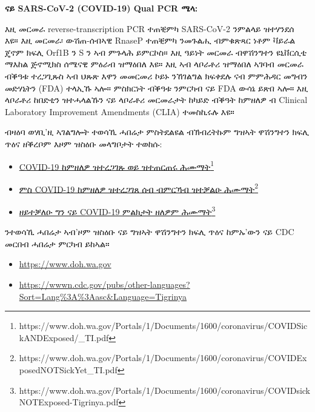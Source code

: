 \documentclass[10pt]{article}
\newcommand{\link}[2]{\href{#1}{#2}\footnote{#1}}
\begin{document}
\bigskip
\textbf{ናይ SARS-CoV-2 (COVID-19) Qual PCR ሜላ:}

እዚ መርመራ reverse-transcription PCR ተጠቒምካ SARS-CoV-2 ንምልላይ ዝተሃንደሰ እዩ። እዚ መርመራ፡
ውሽጠ-ሰብኣዊ RnaseP ተጠቒምካ ንመጉልሒ ብምቁጽጻር ነቶም ቫይራል ጄኖም ክፍሊ Orf1B ን S ን ኣብ ምጉላሕ
ይምርኮስ። እዚ ዓይነት መርመራ ብዋሽንግተን ዩኒቨርሲቲ ማእከል ጅኖሚክስ ሰሜናዊ ምዕራብ ዝማዕበለ እዩ። እዚ ኣብ
ላቦራቶሪ ዝማዕበለ ኣገባብ መርመራ ብቕዓቱ ተረጋጊጹስ ኣብ ህጹጽ እዋን መመርመሪ ኮይኑ ንኸገልግል ክፍቀደሉ ናብ
ምምሕዳር መግብን መድሃኒትን (FDA) ተላኢኹ ኣሎ። ምስክርነት ብቕዓቱ ንምርካብ ናይ FDA ውሳኔ ይጽበ ኣሎ። እዚ
ላቦራቶሪ ከበድቲን ዝተሓላልኹን ናይ ላቦራቶሪ መርመራታት ከካይድ ብቕዓት ከምዘለዎ ብ Clinical Laboratory
Improvement Amendments (CLIA) ተመስኪሩሉ እዩ።

ብዛዕባ ወሃቢ’ዚ ኣገልግሎት ተወሳኺ ሓበሬታ ምስትደልዩል ብኽብረትኩም ግዝኣት ዋሽንግተን ክፍሊ ጥዕና ዘቕረቦም እዞም
ዝስዕቡ መላግቦታት ተወከሱ:

\begin{itemize}
\item

  \link{https://www.doh.wa.gov/Portals/1/Documents/1600/coronavirus/COVIDSickANDExposed/_TI.pdf}{COVID-19
  ከምዘለዎ ዝተረጋገጹ ወይ ዝተጠርጠሩ ሕሙማት}

\item

  \link{https://www.doh.wa.gov/Portals/1/Documents/1600/coronavirus/COVIDExposedNOTSickYet\_TI.pdf}{ምስ
  COVID-19 ከምዘለዎ ዝተረጋገጸ ሰብ ብምርኻብ ዝተቓልዑ ሕሙማት}

\item

  \link{https://www.doh.wa.gov/Portals/1/Documents/1600/coronavirus/COVIDsickNOTExposed-Tigrinya.pdf}{ዘይተቓለዑ
  ግን ናይ COVID-19 ምልክታት ዘለዎም ሕሙማት}

\end{itemize}

ንተወሳኺ ሓበሬታ ኣብ’ዞም ዝስዕቡ ናይ ግዝኣት ዋሽንግተን ክፍሊ ጥዕና ከምኡ’ውን ናይ CDC መርበብ ሓበሬታ
ምርካብ ይከኣል።

\begin{itemize}
\item

  \url{https://www.doh.wa.gov}

\item

  \url{https://wwwn.cdc.gov/pubs/other-languages?Sort=Lang%3A%3Aasc&Language=Tigrinya}

\end{itemize}
\end{document}
